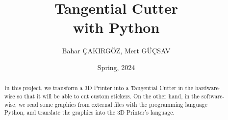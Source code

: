 \documentclass{deumathproject}
\author{Bahar ÇAKIRGÖZ, Mert GÜÇSAV}
\date{Spring, 2024} %
\title{Tangential Cutter\\ with Python} %
\begin{document}
	\maketitle
	
	\begin{abstract} %
	In this project,
    we transform a 3D Printer into a Tangential Cutter in the hardware-wise
    so that it will be able to cut custom stickers.
    On the other hand, in the software-wise, we read some graphics from external files with the programming language Python,
    and translate the graphics into the 3D Printer's language.
	\end{abstract}
	
	\tableofcontents
	\listoffigures  %
	
	
	
	\clearpage                     %
	
	
	
	
	
	
	
	\startbibliography

		
	
	
	
\end{document}
